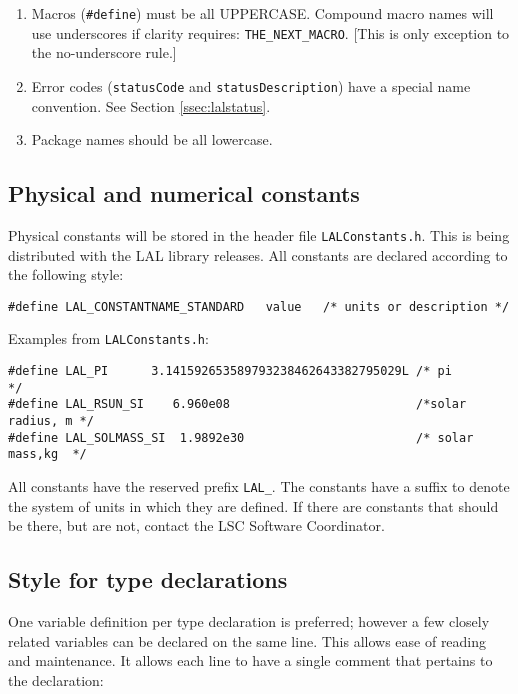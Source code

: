 \documentclass[]{ligodcc}
\begin{document}
\begin{enumerate}
\item
Macros ({\tt \#define})  must be all UPPERCASE. Compound macro names
will use underscores if clarity requires: {\tt THE\_NEXT\_MACRO}. [This is
only exception to the no-underscore rule.]


\item
Error codes ({\tt statusCode} and {\tt statusDescription}) have a special
name convention. See Section \ref{ssec:lalstatus}.

\item
Package names should be all lowercase.

\end{enumerate}


\subsection{Physical and numerical constants}

Physical constants will be stored in the header file {\tt LALConstants.h}.
This is being distributed with the LAL library releases. All constants
are declared according to the following style:
{\footnotesize
\begin{verbatim}
#define LAL_CONSTANTNAME_STANDARD   value   /* units or description */ 
\end{verbatim}}

\noindent
Examples from {\tt LALConstants.h}:

{\footnotesize
\begin{verbatim}
#define LAL_PI      3.141592653589793238462643382795029L /* pi             */
#define LAL_RSUN_SI    6.960e08                          /*solar radius, m */
#define LAL_SOLMASS_SI  1.9892e30                        /* solar mass,kg  */
\end{verbatim}}

All constants have the reserved prefix {\tt LAL\_}. The constants have a
suffix to denote the system of units in which they are defined. If
there are constants that should be there, but are not, contact the LSC
Software Coordinator.

\subsection{Style for type declarations}

One variable definition per type declaration is preferred; however a
few closely related variables can be declared on the same line. This
allows ease of reading and maintenance. It allows each line to have a
single comment that pertains to the declaration:
\end{document}
